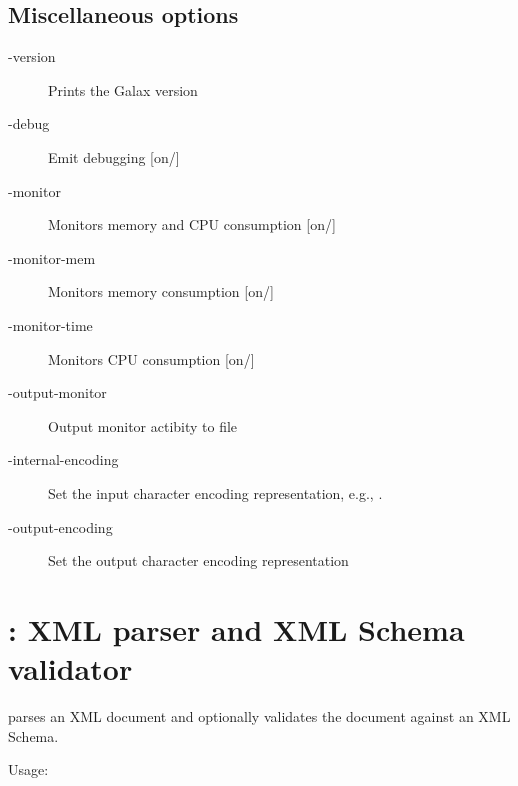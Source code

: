 
\subsection{Miscellaneous options}
\begin{description}
\item[-version]  Prints the Galax version
\item[-debug]  Emit debugging [on/]

\item[-monitor] Monitors memory and CPU consumption [on/]
\item[-monitor-mem]  Monitors memory consumption [on/]
\item[-monitor-time]  Monitors CPU consumption [on/]
\item[-output-monitor]  Output monitor actibity to file

\item[-internal-encoding]  Set the input character encoding
  representation, e.g., .
\item[-output-encoding]  Set the output character encoding representation
\end{description}

\section{: XML parser and XML Schema validator}

 parses an XML document and optionally validates the
document against an XML Schema. 

Usage: 

